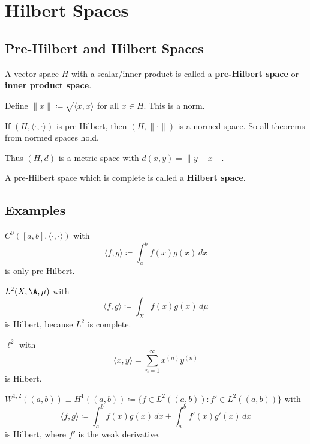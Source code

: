 \section{Hilbert Spaces}
\subsection{Pre-Hilbert and Hilbert Spaces}

\begin{definition}
A vector space $H$ with a scalar/inner product is called a \textbf{pre-Hilbert space} or \textbf{inner product space}. 

Define $\|x\| \coloneqq \sqrt{\langle x, x \rangle}$ for all $x \in H$. This is a norm.

If $(H, \langle \cdot, \cdot \rangle)$ is pre-Hilbert, then $(H, \|\cdot\|)$ is a normed space. So all theorems from normed spaces hold.

Thus $(H, d)$ is a metric space with $d(x,y) = \|y - x\|$.

A pre-Hilbert space which is complete is called a \textbf{Hilbert space}.
\end{definition}

\subsection*{Examples}

\begin{example}
$C^0([a,b], \langle \cdot, \cdot \rangle)$ with 
\[
\langle f, g \rangle \coloneqq \int_a^b f(x)g(x) \, dx
\]
is only pre-Hilbert.
\end{example}

\begin{example}
$L^2(X, \A, \mu)$ with 
\[
\langle f, g \rangle \coloneqq \int_X f(x)g(x) \, d\mu
\]
is Hilbert, because $L^2$ is complete.
\end{example}

\begin{example}
$\ell^2$ with 
\[
\langle x, y \rangle = \sum_{n=1}^{\infty} x^{(n)} y^{(n)}
\]
is Hilbert.
\end{example}

\begin{example}
$W^{1,2}((a,b)) \equiv H^1((a,b)) \coloneqq \{ f \in L^2((a,b)) : f' \in L^2((a,b)) \}$ with
\[
\langle f, g \rangle \coloneqq \int_a^b f(x)g(x) \, dx + \int_a^b f'(x) g'(x) \, dx
\]
is Hilbert, where $f'$ is the weak derivative.
\end{example}

